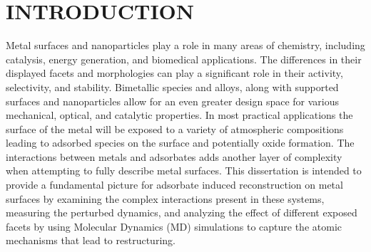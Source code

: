 %

\chapter{INTRODUCTION}
Metal surfaces and nanoparticles play a role in many areas of chemistry,
including catalysis\citep{}, energy generation\citep{}, and biomedical
applications.\citep{} The differences in their displayed facets and morphologies can play a
significant role in their activity\citep{}, selectivity\citep{}, and
stability\citep{}. Bimetallic species and alloys\citep{}, along with supported
surfaces and nanoparticles\citep{} allow for an even greater design space for
various mechanical\citep{}, optical\citep{}, and catalytic properties.\citep{}
In most practical applications the surface of the metal will be exposed to a
variety of atmospheric compositions leading to adsorbed species on the surface
and potentially oxide formation. The interactions between metals and adsorbates
adds another layer of complexity when attempting to fully describe metal
surfaces.  This dissertation is intended to provide a fundamental picture for
adsorbate induced reconstruction on metal surfaces by examining the complex
interactions present in these systems, measuring the perturbed dynamics, and
analyzing the effect of different exposed facets by using Molecular Dynamics
(MD) simulations to capture the atomic mechanisms that lead to restructuring.




